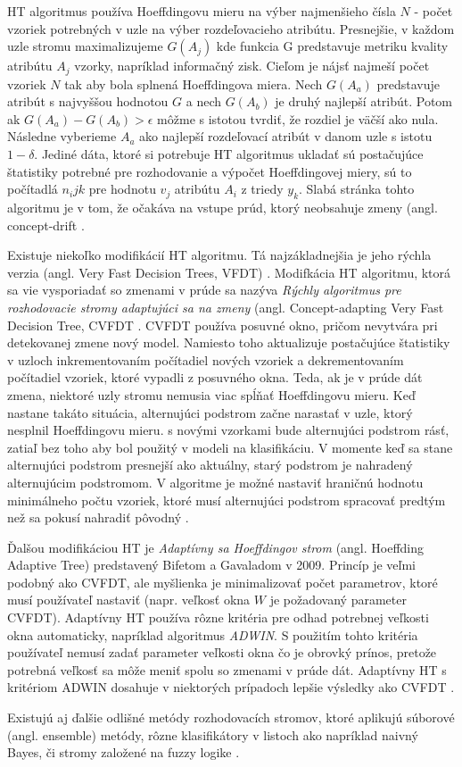 HT algoritmus používa Hoeffdingovu mieru na výber najmenšieho čísla $N$ - počet vzoriek potrebných v uzle na výber rozdeľovacieho atribútu. Presnejšie, v každom uzle stromu maximalizujeme $G(A_j)$ kde funkcia G predstavuje metriku kvality atribútu $A_j$ vzorky, napríklad informačný zisk. Cieľom je nájsť najmeší počet vzoriek $N$ tak aby bola splnená Hoeffdingova miera. Nech $G(A_a)$ predstavuje atribút s najvyššou hodnotou $G$ a nech $G(A_b)$ je druhý najlepší atribút. Potom ak $G(A_a) - G(A_b) > \epsilon$ môžme s istotou tvrdiť, že rozdiel je väčší ako nula. Následne vyberieme $A_a$ ako najlepší rozdeľovací atribút v danom uzle s istotu $1-\delta$. Jediné dáta, ktoré si potrebuje HT algoritmus ukladať sú postačujúce štatistiky potrebné pre rozhodovanie a výpočet Hoeffdingovej miery, sú to počítadlá $n_ijk$ pre hodnotu $v_j$ atribútu $A_i$ z triedy $y_k$. Slabá stránka tohto algoritmu je v tom, že očakáva na vstupe prúd, ktorý neobsahuje zmeny (angl. concept-drift \citep{domingos2000mining}.
\par %
Existuje niekoľko modifikácií HT algoritmu. Tá najzákladnejšia je jeho rýchla verzia (angl. Very Fast Decision Trees, VFDT) \citep{domingos2000mining}. Modifkácia HT algoritmu, ktorá sa vie vysporiadať so zmenami v prúde sa nazýva \textit{Rýchly algoritmus pre rozhodovacie stromy adaptujúci sa na zmeny} (angl. Concept-adapting Very Fast Decision Tree, CVFDT \citep{hulten2001mining}. CVFDT používa posuvné okno, pričom nevytvára pri detekovanej zmene nový model. Namiesto toho aktualizuje postačujúce štatistiky v uzloch inkrementovaním počítadiel nových vzoriek a dekrementovaním počítadiel vzoriek, ktoré vypadli z posuvného okna. Teda, ak je v prúde dát zmena, niektoré uzly stromu nemusia viac spĺňať Hoeffdingovu mieru. Keď nastane takáto situácia, alternujúci podstrom začne narastať v uzle, ktorý nesplnil Hoeffdingovu mieru. s novými vzorkami bude alternujúci podstrom rásť, zatiaľ bez toho aby bol použitý v modeli na klasifikáciu. V momente keď sa stane alternujúci podstrom presnejší ako aktuálny, starý podstrom je nahradený alternujúcim podstromom. V algoritme je možné nastaviť hraničnú hodnotu minimálneho počtu vzoriek, ktoré musí alternujúci podstrom spracovať predtým než sa pokusí nahradiť pôvodný \citep{hulten2001mining}.
\par
Ďalšou modifikáciou HT je \textit{Adaptívny sa Hoeffdingov strom} (angl. Hoeffding Adaptive Tree) predstavený Bifetom a Gavaladom v 2009. Princíp je veľmi podobný ako CVFDT, ale myšlienka je minimalizovať počet parametrov, ktoré musí používateľ nastaviť (napr. veľkosť okna $W$ je požadovaný parameter CVFDT). Adaptívny HT používa rôzne 	kritéria pre odhad potrebnej veľkosti okna automaticky, napríklad algoritmus \textit{ADWIN}. S použitím tohto kritéria používateľ nemusí zadať parameter veľkosti okna čo je obrovký prínos, pretože potrebná veľkosť sa môže meniť spolu so zmenami v prúde dát. Adaptívny HT s kritériom ADWIN dosahuje v niektorých prípadoch lepšie výsledky ako CVFDT \citep{bifet2009adaptive}.
\par
Existujú aj ďalšie odlišné metódy rozhodovacích stromov, ktoré aplikujú súborové (angl. ensemble) metódy, rôzne klasifikátory v listoch ako napríklad naivný Bayes, či stromy založené na fuzzy logike \citep{aggarwal2014survey}.


